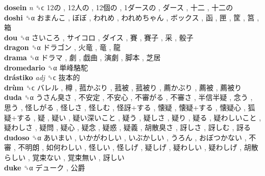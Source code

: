 \textbf{dosein} \emph{n}  ␝ϲ   12の ,  12人の ,  12個の ,  1ダースの ,  ダース ,  十二 ,  十二の   \\
\textbf{doshi} ␝α   おまんこ ,  ぼぼ ,  われめ ,  われめちゃん ,  ボックス ,  函 ,  匣 ,  筐 ,  筥 ,  箱   \\
\textbf{dou} ␝α   さいころ ,  サイコロ ,  ダイス ,  賽 ,  賽子 ,  采 ,  骰子   \\
\textbf{dragon} ␝α   ドラゴン ,  火竜 ,  竜 ,  龍   \\
\textbf{drama} ␝α   ドラマ ,  劇 ,  戯曲 ,  演劇 ,  脚本 ,  芝居   \\
\textbf{dromedario} ␝α   単峰駱駝   \\
\textbf{drástiko} \emph{adj}  ␝ϲ   抜本的   \\
\textbf{drùm} ␝ϲ   バレル ,  樽 ,  菰かぶり ,  菰被 ,  菰被り ,  薦かぶり ,  薦被 ,  薦被り   \\
\textbf{duda} ␝α   うさん臭さ ,  不安定 ,  不安心 ,  不審がる ,  不審さ ,  半信半疑 ,  念う ,  思う ,  怪しがる ,  怪しさ ,  怪しむ ,  怪訝+する ,  懐疑 ,  懐疑+する ,  懐疑心 ,  狐疑+する ,  疑 ,  疑い ,  疑い深いこと ,  疑う ,  疑しさ ,  疑り ,  疑る ,  疑わしいこと ,  疑わしさ ,  疑問 ,  疑心 ,  疑念 ,  疑惑 ,  疑義 ,  胡散臭さ ,  訝しさ ,  訝しむ ,  訝る   \\
\textbf{dudoso} ␝α   あいまい ,  いかがわしい ,  いぶかしい ,  うろん ,  おぼつかない ,  不審 ,  不明朗 ,  如何わしい ,  怪しい ,  怪しげ ,  疑しげ ,  疑わしい ,  疑わしげ ,  胡散らしい ,  覚束ない ,  覚束無い ,  訝しい   \\
\textbf{duke} ␝α   デューク ,  公爵   \\
